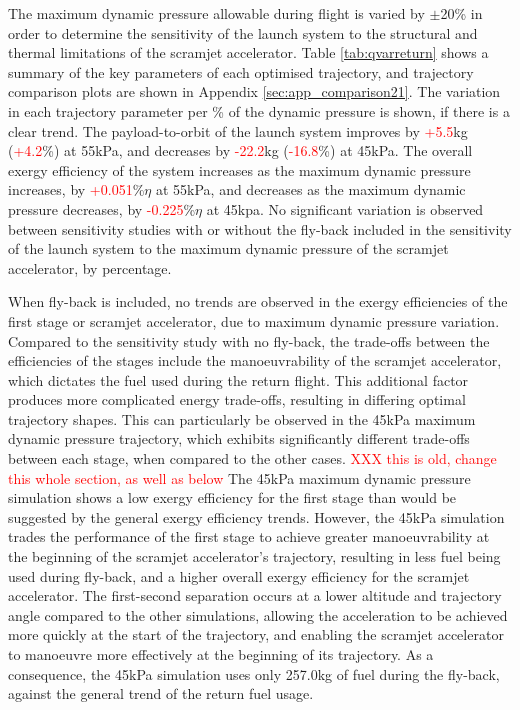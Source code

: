 The maximum dynamic pressure allowable during flight is varied by $\pm$20\% in order to determine the sensitivity of the launch system to the structural and thermal limitations of the scramjet accelerator.  
Table \ref{tab:qvarreturn} shows a summary of the key parameters of each optimised trajectory, and trajectory comparison plots are shown in Appendix \ref{sec:app_comparison21}. The variation in each trajectory parameter per \% of the dynamic pressure is shown, if there is a clear trend. The payload-to-orbit of the launch system improves by \textcolor{red}{+5.5}kg (\textcolor{red}{+4.2}\%) at 55kPa, and decreases by \textcolor{red}{-22.2}kg (\textcolor{red}{-16.8}\%) at 45kPa.
The overall exergy efficiency of the system increases as the maximum dynamic pressure increases, by \textcolor{red}{+0.051}\%$\eta$ at 55kPa, and decreases as the maximum dynamic pressure decreases, by \textcolor{red}{-0.225}\%$\eta$ at 45kpa. 
No significant variation is observed between sensitivity studies with or without the fly-back included in the sensitivity of the launch system to the maximum dynamic pressure of the scramjet accelerator, by percentage.

When fly-back is included, no trends are observed in the exergy efficiencies of the first stage or scramjet accelerator, due to maximum dynamic pressure variation. Compared to the sensitivity study with no fly-back, the trade-offs between the efficiencies of the stages include the manoeuvrability of the scramjet accelerator, which dictates the fuel used during the return flight. This additional factor produces more complicated energy trade-offs, resulting in differing optimal trajectory shapes. This can particularly be observed in the 45kPa maximum dynamic pressure trajectory, which exhibits significantly different trade-offs between each stage, when compared to the other cases. \textcolor{red}{XXX this is old, change this whole section, as well as below}
 The 45kPa maximum dynamic pressure simulation shows a low exergy efficiency for the first stage than would be suggested by the general exergy efficiency trends. 
 However, the 45kPa simulation trades the performance of the first stage to achieve greater manoeuvrability at the beginning of the scramjet accelerator's trajectory, resulting in less fuel being used during fly-back, and a higher overall exergy efficiency for the scramjet accelerator. The first-second separation occurs at a lower altitude and trajectory angle compared to the other simulations, allowing the acceleration to be achieved more quickly at the start of the trajectory, and enabling the scramjet accelerator to manoeuvre more effectively at the beginning of its trajectory. 
 As a consequence, the 45kPa simulation uses only 257.0kg of fuel during the fly-back, against the general trend of the return fuel usage. 

